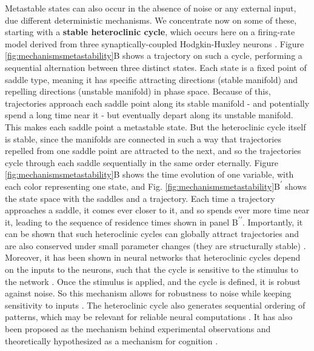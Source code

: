 \documentclass[reprint,superscriptaddress,showpacs,amsmath,amssymb,aps,floatfix,nolongbibliography]{revtex4-2}
\theoremstyle{definition}
\newcommand{\Emph}[1]{\textbf{#1}}
\newcommand*{\supprime}{\textsuperscript{\everymodeprime}\xspace}
\newcommand*{\ssupprime}{\textsuperscript{\everymodeprime\everymodeprime\xspace}}
\newcommand*{\everymodeprime}{\ensuremath{\prime}}
\begin{document}
Metastable states can also occur in the absence of noise or any external input, due different deterministic mechanisms. We concentrate now on some of these, starting with a \Emph{stable heteroclinic cycle}, which occurs here on a firing-rate model derived from three synaptically-coupled Hodgkin-Huxley neurons \cite{ashwin2011criteria}. Figure \ref{fig:mechanismsmetastability}B shows a trajectory on such a cycle, performing a sequential alternation between three distinct states. Each state is a fixed point of saddle type, meaning it has specific attracting directions (stable manifold) and repelling directions (unstable manifold) in phase space. Because of this, trajectories approach each saddle point along its stable manifold - and potentially spend a long time near it - but eventually depart along its unstable manifold. This makes each saddle point a metastable state. But the heteroclinic cycle itself is stable, since the manifolds are connected in such a way that trajectories repelled from one saddle point are attracted to the next, and so the trajectories cycle through each saddle sequentially in the same order eternally. Figure \ref{fig:mechanismsmetastability}B shows the time evolution of one variable, with each color representing one state, and Fig. \ref{fig:mechanismsmetastability}B\supprime shows the state space with the saddles and a trajectory. Each time a trajectory approaches a saddle, it comes ever closer to it, and so spends ever more time near it, leading to the sequence of residence times shown in panel B\ssupprime. Importantly, it can be shown that such heteroclinic cycles can globally attract trajectories \cite{nowotny2007dynamical} and are also conserved under small parameter changes (they are structurally stable) \cite{rabinovich2008transientcognitive}. 
Moreover, it has been shown in neural networks that heteroclinic cycles depend on the inputs to the neurons, such that the cycle is sensitive to the stimulus to the network \cite{rabinovich2001dynamical}. Once the stimulus is applied, and the cycle is defined, it is robust against noise. So this mechanism allows for robustness to noise while keeping sensitivity to inputs \cite{rabinovich2001dynamical, rabinovich2008transientcognitive}. The heteroclinic cycle also generates sequential ordering of patterns, which may be relevant for reliable neural computations \cite{fonollosa2015learning}. It has also been proposed as the mechanism behind experimental observations \cite{rabinovich2008transientcognitive, rabinovich2008transientdynamics, rabinovich2012information} and theoretically hypothesized as a mechanism for cognition \cite{fonollosa2015learning, rabinovich2014chunking}.
\end{document}
